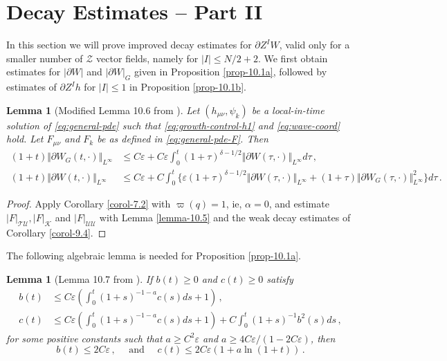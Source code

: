 \documentclass[11pt, a4paper]{amsart}
\numberwithin{equation}{section}
\newtheorem{lemma}[theorem]{Lemma}
\numberwithin{theorem}{section}
\newcommand{\p}{\partial}
\newcommand{\mn}{{\mu \nu}}
\newcommand{\UU}{{\mathcal{U} \mathcal{U}}}
\newcommand{\TU}{{\mathcal{T} \mathcal{U}}}
\newcommand{\K}{\mathcal{K}}
\newcommand{\I}{\vert I \vert}
\begin{document}
\section{Decay Estimates -- Part II} \label{section:decay-2}
In this section we will prove improved decay estimates for $\p Z^I W$, valid only for a smaller number of $\mathcal{Z}$ vector fields, namely for $\I \leq N/2 + 2$. We first obtain estimates for $\vert \p W \vert$ and $\vert \p W \vert_G$ given in Proposition \ref{prop-10.1a}, followed by estimates of $\p Z^I h$ for $\I \leq 1$ in Proposition \ref{prop-10.1b}. 

\begin{lemma}[Modified Lemma 10.6 from \cite{LR:04}] \label{lemma-10.6} 
Let $(h_\mn, \psi_k)$ be a local-in-time solution of \eqref{eq:general-pde} such that \eqref{eq:growth-control-h1} and \eqref{eq:wave-coord} hold. Let $F_\mn$ and $F_k$ be as defined in \eqref{eq:general-pde-F}. Then
\begin{align*}
(1+t) \Vert \p W_G (t, \cdot) \Vert_{L^\infty} & \leq C \varepsilon + C \varepsilon \int_0^t (1+\tau)^{\delta-1/2} \Vert \p W(\tau, \cdot)  \Vert_{L^\infty} d \tau \,, \\
(1+t) \Vert \p W (t, \cdot) \Vert_{L^\infty} & \leq C \varepsilon + C \int_0^t \Big\lbrace \varepsilon (1+\tau)^{\delta - 1/2} \Vert  \p W ( \tau, \cdot)  \Vert_{L^\infty} + (1+\tau) \Vert \p W_G (\tau, \cdot) \Vert^2_{L^\infty} \Big\rbrace d \tau \,.
\end{align*}
\end{lemma}
\begin{proof}
Apply Corollary \ref{corol-7.2} with $\varpi(q) =1$, ie, $\alpha = 0$, and estimate $\vert F \vert_\TU, \vert F \vert_\K$ and $\vert F \vert_\UU$ with Lemma \ref{lemma-10.5} and the weak decay estimates of Corollary \ref{corol-9.4}.
\end{proof}

The following algebraic lemma is needed for Proposition \ref{prop-10.1a}. 
\begin{lemma}[Lemma 10.7 from \cite{LR:04}] \label{lemma-10.7}
If $b(t) \geq 0$ and $c(t) \geq 0$ satisfy
\begin{align*}
b(t) & \leq C \varepsilon \left( \int_0^t (1+s)^{-1-a} c(s) ds + 1 \right) \,, \\
c(t) & \leq C \varepsilon \left( \int_0^t (1+s)^{-1-a} c(s) ds + 1 \right) + C \int_0^t (1+s)^{-1} b^2(s) ds \,,
\end{align*}
for some positive constants such that $a \geq C^2 \varepsilon$ and $a \geq 4 C \varepsilon / (1-2C\varepsilon)$, then
$$ b(t) \leq 2 C \varepsilon \,, \quad \text{ and } \quad c(t) \leq 2C \varepsilon (1+ a \ln (1+t)) \,.$$
\end{lemma}
\end{document}
